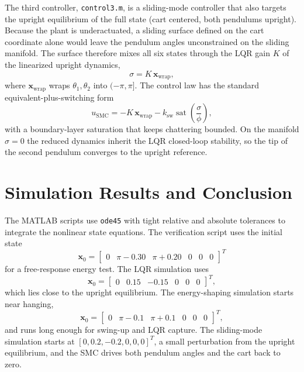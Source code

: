 \documentclass[11pt,a4paper]{article}
\newcommand{\sectionpage}{\clearpage}
\newcommand{\sat}{\operatorname{sat}}
\begin{document}
The third controller, \texttt{control3.m}, is a sliding-mode controller that also targets the upright equilibrium of the full state (cart centered, both pendulums upright). Because the plant is underactuated, a sliding surface defined on the cart coordinate alone would leave the pendulum angles unconstrained on the sliding manifold. The surface therefore mixes all six states through the LQR gain $K$ of the linearized upright dynamics,
\begin{equation}
    \sigma = K\,\bm x_{\mathrm{wrap}},
\end{equation}
where $\bm x_{\mathrm{wrap}}$ wraps $\theta_1,\theta_2$ into $(-\pi,\pi]$. The control law has the standard equivalent-plus-switching form
\begin{equation}
    u_{\mathrm{SMC}}=-K\,\bm x_{\mathrm{wrap}}-k_{\mathrm{sw}}\sat\!\left(\frac{\sigma}{\phi}\right),
\end{equation}
with a boundary-layer saturation that keeps chattering bounded. On the manifold $\sigma=0$ the reduced dynamics inherit the LQR closed-loop stability, so the tip of the second pendulum converges to the upright reference.

\sectionpage
\section{Simulation Results and Conclusion}

The MATLAB scripts use \texttt{ode45} with tight relative and absolute tolerances to integrate the nonlinear state equations. The verification script uses the initial state
\begin{equation}
    \bm x_0=
    \begin{bmatrix}
        0&\pi-0.30&\pi+0.20&0&0&0
    \end{bmatrix}^{T}
\end{equation}
for a free-response energy test. The LQR simulation uses
\begin{equation}
    \bm x_0=
    \begin{bmatrix}
        0&0.15&-0.15&0&0&0
    \end{bmatrix}^{T},
\end{equation}
which lies close to the upright equilibrium. The energy-shaping simulation starts near hanging,
\begin{equation}
    \bm x_0=
    \begin{bmatrix}
        0&\pi-0.1&\pi+0.1&0&0&0
    \end{bmatrix}^{T},
\end{equation}
and runs long enough for swing-up and LQR capture. The sliding-mode simulation starts at $[0,0.2,-0.2,0,0,0]^T$, a small perturbation from the upright equilibrium, and the SMC drives both pendulum angles and the cart back to zero.
\end{document}
